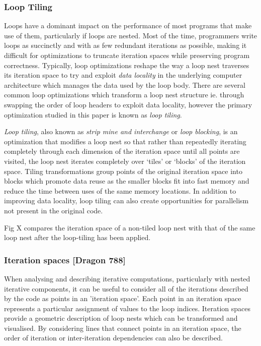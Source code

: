 \documentclass[a4paper,12pt,twoside]{report}
\begin{document}
\begin{itemize}
\subsubsection{Loop Tiling}
Loops have a dominant impact on the performance of most programs that make use of them, particularly if loops are nested.
Most of the time, programmers write loops as succinctly and with as few redundant iterations as possible, making it difficult
for optimizations to truncate iteration spaces while preserving program correctness. Typically, loop optimizations reshape the
way a loop nest traverses its iteration space to try and exploit \textit{data locality} in the underlying computer architecture which
manages the data used by the loop body. There are several common loop optimizations which transform a loop nest structure ie. through
swapping the order of loop headers to exploit data locality, however the primary optimization studied in this paper is known as
\textit{loop tiling}.

\textit{Loop tiling}, also known as \textit{strip mine and interchange} or \textit{loop blocking}, is an optimization that modifies 
a loop nest so that rather than repeatedly iterating completely through each dimension of the iteration space until all points are
visited, the loop nest iterates completely over `tiles' or `blocks' of the iteration space. Tiling transformations group points of
the original iteration space into blocks which promote data reuse as the smaller blocks fit into fast memory and reduce the time between
uses of the same memory locations. In addition to improving data locality, loop tiling can also create opportunities for parallelism not 
present in the original code.

Fig X compares the iteration space of a non-tiled loop nest with that of the same loop nest after the loop-tiling has been applied.

\subsubsection{Iteration spaces [Dragon 788]}
When analysing and describing iterative computations, particularly with nested iterative components, it can be useful to consider 
all of the iterations described by the code as points in an 'iteration space'. Each point in an iteration space represents a
particular assignment of values to the loop indices. Iteration spaces provide a geometric description of loop nests which can be
transformed and visualised. By considering lines that connect points in an iteration space, the order of iteration or 
inter-iteration dependencies can also be described.


\end{itemize}
\end{document}

